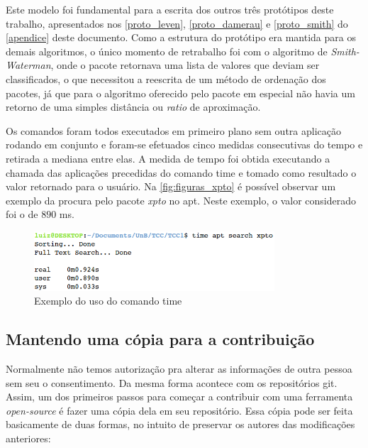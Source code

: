 Este modelo foi fundamental para a escrita dos outros três protótipos deste trabalho, apresentados nos \autoref{proto_leven}, \autoref{proto_damerau} e \autoref{proto_smith} do \autoref{apendice} deste documento. Como a estrutura do protótipo era mantida para os demais algoritmos, o único momento de retrabalho foi com o algoritmo de \textit{Smith-Waterman}, onde o pacote retornava uma lista de valores que deviam ser classificados, o que  necessitou a reescrita de um método de ordenação dos pacotes, já que para o algoritmo oferecido pelo pacote em especial não havia um retorno de uma simples distância ou \textit{ratio} de aproximação.

Os comandos foram todos executados em primeiro plano sem outra aplicação rodando em conjunto e foram-se efetuados cinco medidas consecutivas do tempo e retirada a mediana entre elas. A medida de tempo foi obtida executando a chamada das aplicações precedidas do comando {\code time} e tomado como resultado o valor retornado para o usuário. Na \autoref{fig:figuras_xpto} é possível observar um exemplo da procura pelo pacote \textit{xpto} no {\code apt}. Neste exemplo, o valor considerado foi o de $890$ ms.

\begin{figure}[htbp]
  \centering
	\includegraphics[width=0.8\textwidth]{figuras/xpto}
  \caption{Exemplo do uso do comando {\code time}}
  \label{fig:figuras_xpto}
\end{figure}


\subsection*{Mantendo uma cópia para a contribuição} %
\label{sub:mantendo_uma_copia_sua}

Normalmente não temos autorização pra alterar as informações de outra pessoa sem seu o consentimento. Da mesma forma  acontece com os repositórios {\code git}. Assim, um dos primeiros passos para começar a contribuir com uma ferramenta \textit{open-source} é fazer uma cópia dela em seu repositório. Essa cópia pode ser feita basicamente de duas formas, no intuito de preservar os autores das modificações anteriores:

